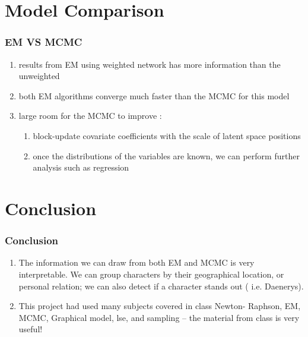 \documentclass[handout]{beamer}
\begin{document}
%
%


\section{Model Comparison}
\begin{frame}
\frametitle{EM VS MCMC}
\begin{enumerate}[a]
\item results from EM using weighted network has more information than the unweighted
\item both EM algorithms converge much faster than the MCMC for this model
\item large room for the MCMC to improve : 
\begin{enumerate}[i]
\item block-update covariate coefficients with the scale of latent space positions 
\item once the distributions of the variables are known, we can perform further analysis such as regression
\end{enumerate}
\end{enumerate}
\end{frame}

%
%

\section{Conclusion}
\begin{frame}
\frametitle{Conclusion}
\begin{enumerate}
\item The information we can draw from both EM and MCMC is very interpretable. We can group characters by their geographical location, or personal relation; we can also detect if a character stands out ( i.e. Daenerys).
\item This project had used many subjects covered in class Newton- Raphson, EM, MCMC, Graphical model, lse, and sampling -- the material from class is very useful!
\end{enumerate}
\end{frame}
\end{document}
